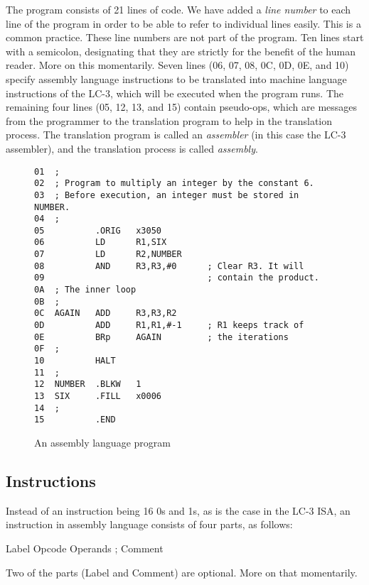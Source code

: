 \documentclass{patt}
\begin{document}
The program consists of 21 lines of code.  We have added a {\em line
  number} to each line of the program in order to be able to refer to
individual lines easily.  This is a common practice.  These line
numbers are not part of the program.  Ten lines start with a
semicolon, designating that they are strictly for the benefit of the
human reader. More on this momentarily.  Seven lines (06, 07, 08, 0C,
0D, 0E, and 10) specify assembly language instructions to be
translated into machine language instructions of the LC-3, which will
be executed when the program runs.  The remaining four
lines (05, 12, 13, and 15) contain pseudo-ops, which are
 messages from the programmer to the translation
program to help in the translation process.  The translation program
is called an {\em assembler}  (in this case the LC-3
assembler), and the translation process
is called {\em assembly}.\\

\begin{figure}
\begin{Verbatim}[fontsize=\fontsize{9}{11}\selectfont,formatcom=\color{seventyblack}]
01  ;
02  ; Program to multiply an integer by the constant 6.
03  ; Before execution, an integer must be stored in NUMBER.
04  ;
05          .ORIG   x3050
06          LD      R1,SIX
07          LD      R2,NUMBER
08          AND     R3,R3,#0      ; Clear R3. It will
09                                ; contain the product.
0A  ; The inner loop
0B  ;
0C  AGAIN   ADD     R3,R3,R2
0D          ADD     R1,R1,#-1     ; R1 keeps track of
0E          BRp     AGAIN         ; the iterations
0F  ;
10          HALT
11  ;
12  NUMBER  .BLKW   1
13  SIX     .FILL   x0006
14  ;
15          .END
\end{Verbatim}
\caption{An assembly language program}
\end{figure}

\vspace{-6pt}

\subsection{Instructions}

Instead of an instruction being 16 0s and 1s, as is the case in the
LC-3 ISA, an instruction in assembly language consists of four parts,
as follows:
\begin{colorverbatim}
Label   Opcode   Operands   ; Comment
\end{colorverbatim}
Two of the parts (Label and Comment) are optional.  More on that
momentarily.
\vspace{-0.1in}
\end{document}
